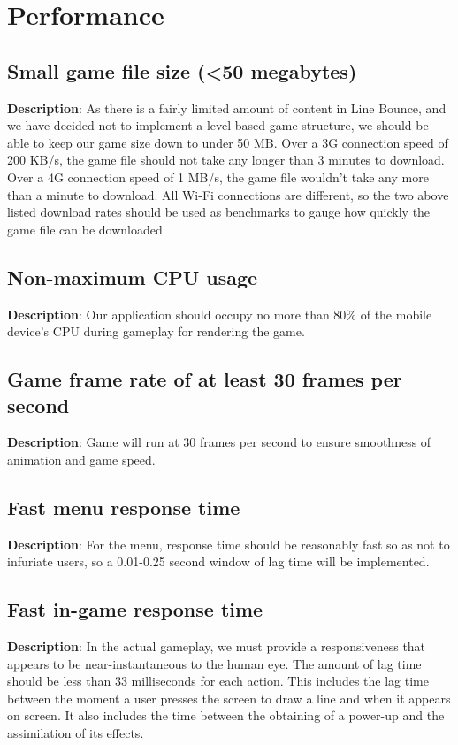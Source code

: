 \section{Performance}
\renewcommand\thesubsection{PER-%
\ifnum\value{subsection}<10 0\fi
\arabic{subsection}}
\subsection{Small game file size (\textless50 megabytes)}
\textbf{Description}: As there is a fairly limited amount of content in Line
Bounce, and we have decided not to implement a level-based game structure,
we should be able to keep our game size down to under 50 MB. Over
a 3G connection speed of 200 KB/s, the game file should not take any
longer than 3 minutes to download. Over a 4G connection speed of 1
MB/s, the game file wouldn\textquoteright{}t take any more than a
minute to download. All Wi-Fi connections are different, so the two
above listed download rates should be used as benchmarks to gauge
how quickly the game file can be downloaded

\subsection{Non-maximum CPU usage}
\textbf{Description}: Our application should occupy no more than 80\% of the
mobile device\textquoteright{}s CPU during gameplay for rendering
the game. 

\subsection{Game frame rate of at least 30 frames per second}
\textbf{Description}: Game will run at 30 frames per second to ensure smoothness
of animation and game speed.

\subsection{Fast menu response time}
\textbf{Description}: For the menu, response time should be reasonably fast
so as not to infuriate users, so a 0.01-0.25 second window of lag
time will be implemented.

\subsection{Fast in-game response time}
\textbf{Description}: In the actual gameplay, we must provide a responsiveness
that appears to be near-instantaneous to the human eye. The amount of lag time
should be less than 33 milliseconds for each action. This includes
the lag time between the moment a user presses the screen to draw
a line and when it appears on screen. It also includes the time between
the obtaining of a power-up and the assimilation of its effects.

